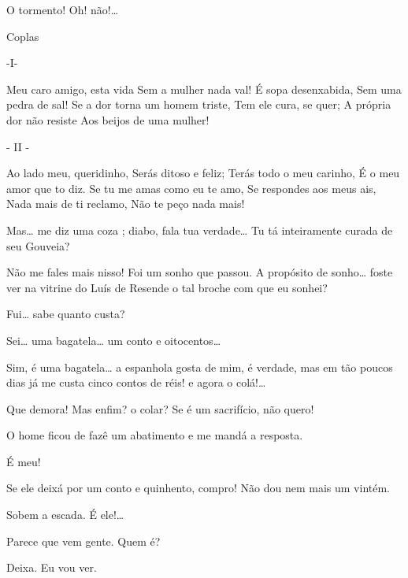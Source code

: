  O tormento! Oh! não!\ldots{}

 Coplas

 -I-

 Meu caro amigo, esta vida
 Sem a mulher nada val!
 É sopa desenxabida,
 Sem uma pedra de sal!
 Se a dor torna um homem triste,
 Tem ele cura, se quer;
 A própria dor não resiste
 Aos beijos de uma mulher!

 - II -

 Ao lado meu, queridinho,
 Serás ditoso e feliz;
 Terás todo o meu carinho,
 É o meu amor que to diz.
 Se tu me amas como eu te amo,
 Se respondes aos meus ais,
 Nada mais de ti reclamo,
 Não te peço nada mais!

 Mas\ldots{} me diz uma coza ; diabo, fala tua verdade\ldots{} Tu tá
inteiramente curada de seu Gouveia?

 Não me fales mais nisso! Foi um sonho que passou.  A
propósito de sonho\ldots{} foste ver na vitrine do Luís de Resende o tal broche com que eu
sonhei?

  Fui\ldots{} sabe quanto custa?

  Sei\ldots{} uma bagatela\ldots{} um conto e oitocentos\ldots{}

  Sim, é uma bagatela\ldots{} a espanhola gosta de mim, é
verdade, mas em tão poucos dias já me custa cinco contos de réis! e agora o colá!\ldots{}

  Que demora!  Mas enfim? o colar? Se é um
sacrifício, não quero!

 O home ficou de fazê um abatimento e me mandá a resposta.

  É meu!

 Se ele deixá por um conto e quinhento, compro! Não dou nem mais
um vintém.

  Sobem a escada. É ele!\ldots{}

 Parece que vem gente.  Quem é?

 Deixa. Eu vou ver. 


